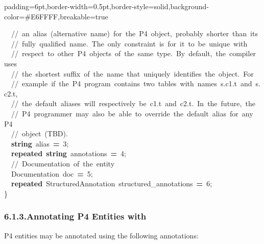 \documentclass[11pt]{article}
\begin{document}
{\begin{mdbmargintb}{6pt}{6pt}
\begin{mdblock}{padding=6pt,border-width=0.5pt,border-style=solid,background-color=\#E6FFFF,breakable=true}
\begin{mdpre}
{{~~{//~an~alias~(alternative~name)~for~the~P4~object,~probably~shorter~than~its}\\
~~{//~fully~qualified~name.~The~only~constraint~is~for~it~to~be~unique~with}\\
~~{//~respect~to~other~P4~objects~of~the~same~type.~By~default,~the~compiler~uses}\\
~~{//~the~shortest~suffix~of~the~name~that~uniquely~identifies~the~object.~For}\\
~~{//~example~if~the~P4~program~contains~two~tables~with~names~s.c1.t~and~s.c2.t,}\\
~~{//~the~default~aliases~will~respectively~be~c1.t~and~c2.t.~In~the~future,~the}\\
~~{//~P4~programmer~may~also~be~able~to~override~the~default~alias~for~any~P4}\\
~~{//~object~(TBD).}\\
~~{\bfseries{string}}~alias~{\bfseries{=}}~{3};\\
~~{\bfseries{repeated}}~{\bfseries{string}}~annotations~{\bfseries{=}}~{4};\\
~~{//~Documentation~of~the~entity}\\
~~Documentation~doc~{\bfseries{=}}~{5};\\
~~{\bfseries{repeated}}~StructuredAnnotation~structured\_annotations~{\bfseries{=}}~{6};\\
\}}}%
\end{mdpre}%
\end{mdblock}%
\end{mdbmargintb}%

\subsubsection{6.1.3.\hspace*{0.5em}Annotating P4 Entities with }\label{sec-annotating-p4-entities-with-documentation}%

\noindent{}P4 entities may be annotated using the following annotations:%

}
\end{document}
